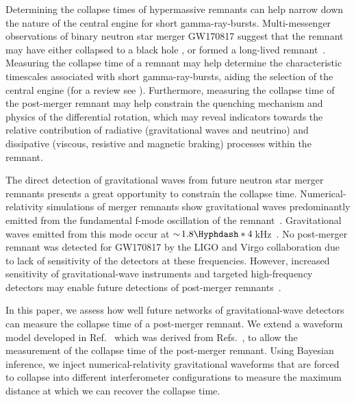 \documentclass[
reprint,
prd,
twocolumn,
nofootinbib,
 amsmath,
showpacs ,amssymb, aps,%
superscriptaddress
]{revtex4-1}
\begin{document}
    Determining the collapse times of hypermassive remnants can help narrow down the nature of the central engine for short gamma-ray-bursts. 
    Multi-messenger observations of binary neutron star merger GW170817 suggest that the remnant may have either collapsed to a black hole \cite[e.g.,][]{Metzger2018,Gill2019,Murguia-Berthier2020}, or formed a long-lived remnant~\cite[e.g.][]{Yu2018}.
    Measuring the collapse time of a remnant may help determine the characteristic timescales associated with short gamma-ray-bursts, aiding the selection of the central engine (for a review see \cite{Zhang2019}).
    Furthermore, measuring the collapse time of the post-merger remnant may help constrain the quenching mechanism and physics of the differential rotation, which may reveal indicators towards the relative contribution of radiative (gravitational waves and neutrino) and dissipative (viscous, resistive and magnetic braking) processes within the remnant.\par

    The direct detection of gravitational waves from future neutron star merger remnants presents a great opportunity to constrain the collapse time.
    Numerical-relativity simulations of merger remnants show gravitational waves predominantly emitted from the fundamental f-mode oscillation of the remnant~\cite{Zhuge1994,Stergioulas2011}.
    Gravitational waves emitted from this mode occur at $\sim\!1.8\Hyphdash*4$\,kHz~\cite{Takami2015,Bernuzzi2015}.
    No post-merger remnant was detected for GW170817 by the LIGO and Virgo collaboration due to lack of sensitivity of the detectors at these frequencies. 
    However, increased sensitivity of gravitational-wave instruments and targeted high-frequency detectors  may enable future detections of post-merger remnants~\cite[e.g.,][]{Martynov2019,NEMO2020}. \par
    
    In this paper, we assess how well future networks of gravitational-wave detectors can measure the collapse time of a post-merger remnant.
    We extend a waveform model developed in Ref.~\cite{Easter2020} which was derived from Refs.~\cite{Bauswein2016,Bose2018}, to allow the measurement of the collapse time of the post-merger remnant.
    Using Bayesian inference, we inject numerical-relativity gravitational waveforms that are forced to collapse into different interferometer configurations to measure the maximum distance at which we can recover the collapse time.\par
\end{document}
